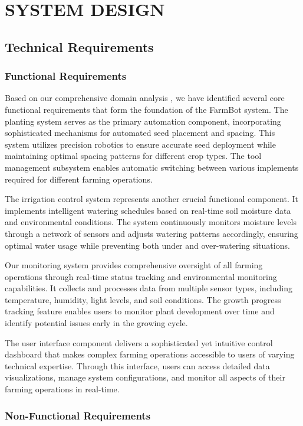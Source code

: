 \chapter{SYSTEM DESIGN}

\section{Technical Requirements}

\subsection{Functional Requirements}
Based on our comprehensive domain analysis \cite{automation2023}, we have identified several core functional requirements that form the foundation of the FarmBot system. The planting system serves as the primary automation component, incorporating sophisticated mechanisms for automated seed placement and spacing. This system utilizes precision robotics to ensure accurate seed deployment while maintaining optimal spacing patterns for different crop types. The tool management subsystem enables automatic switching between various implements required for different farming operations.

The irrigation control system represents another crucial functional component. It implements intelligent watering schedules based on real-time soil moisture data and environmental conditions. The system continuously monitors moisture levels through a network of sensors and adjusts watering patterns accordingly, ensuring optimal water usage while preventing both under and over-watering situations.

Our monitoring system provides comprehensive oversight of all farming operations through real-time status tracking and environmental monitoring capabilities. It collects and processes data from multiple sensor types, including temperature, humidity, light levels, and soil conditions. The growth progress tracking feature enables users to monitor plant development over time and identify potential issues early in the growing cycle.

The user interface component delivers a sophisticated yet intuitive control dashboard that makes complex farming operations accessible to users of varying technical expertise. Through this interface, users can access detailed data visualizations, manage system configurations, and monitor all aspects of their farming operations in real-time.

\subsection{Non-Functional Requirements}

